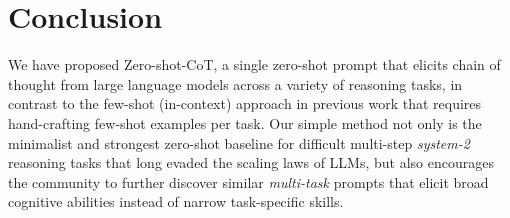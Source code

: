 \documentclass{article}
\newcommand{\mr}[1]{{\color{teal}[{#1} --MR]}}
\newcommand{\CoT}{chain of thought\xspace}
\newcommand{\ours}{Zero-shot-CoT\xspace}
\newcommand{\theirs}{Few-shot-CoT\xspace}
\begin{document}




\section{Conclusion}
We have proposed \ours,  a single zero-shot prompt that elicits \CoT from large language models across a variety of reasoning tasks, in contrast to the few-shot (in-context) approach in previous work that requires hand-crafting few-shot examples per task. 
Our simple method not only is the minimalist and strongest zero-shot baseline for difficult multi-step \textit{system-2} reasoning tasks that long evaded the scaling laws of LLMs, but also encourages the community to further discover similar \textit{multi-task} prompts that elicit broad cognitive abilities instead of narrow task-specific skills.
%
\end{document}
